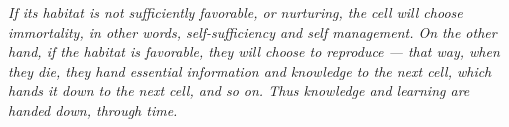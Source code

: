 \textit{If its habitat is not sufficiently favorable, or nurturing, the cell will choose immortality, in other words, self-sufficiency and self management. On the other hand, if the habitat is favorable, they will choose to reproduce — that way, when they die, they hand essential information and knowledge to the next cell, which hands it down to the next cell, and so on. Thus knowledge and learning are handed down, through time.}